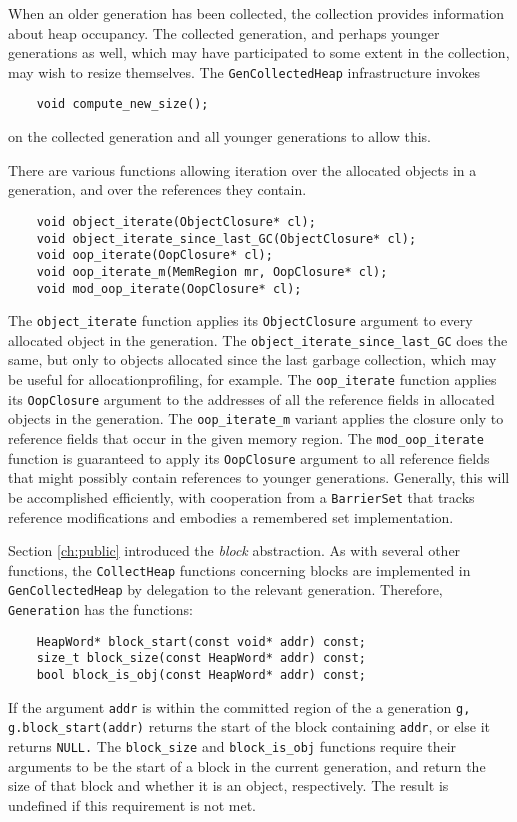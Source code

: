\documentclass{article}
\begin{document}
When an older generation has been collected, the collection provides
information about heap occupancy.  The collected generation, and
perhaps younger generations as well, which may have participated to
some extent in the collection, may wish to resize themselves.
The {\tt GenCollectedHeap} infrastructure invokes
\begin{verbatim}
    void compute_new_size();
\end{verbatim}
on the collected generation and all younger generations to allow this.

There are various functions allowing iteration over the allocated
objects in a generation, and over the references they contain.
\begin{verbatim}
    void object_iterate(ObjectClosure* cl);
    void object_iterate_since_last_GC(ObjectClosure* cl);
    void oop_iterate(OopClosure* cl);
    void oop_iterate_m(MemRegion mr, OopClosure* cl);
    void mod_oop_iterate(OopClosure* cl);
\end{verbatim}
The {\tt object\_iterate} function applies its {\tt ObjectClosure} argument
to every allocated object in the generation.  The 
{\tt object\_iterate\_since\_last\_GC} does the same, but only to objects
allocated since the last garbage collection, which may be useful for
allocationprofiling, for example.    The {\tt oop\_iterate} function applies its {\tt OopClosure}
argument to the addresses of all the reference fields in allocated
objects in the generation.  The {\tt oop\_iterate\_m} variant applies
the closure only to reference fields that occur in the given memory
region.  The {\tt mod\_oop\_iterate} function is guaranteed to apply its
{\tt OopClosure} argument to all reference fields that might possibly
contain references to younger generations.  Generally, this will be
accomplished efficiently, with cooperation from a {\tt BarrierSet}
that tracks reference modifications and embodies a remembered set
implementation.  

Section \ref{ch:public} introduced the {\em block} abstraction.  As
with several other functions, the {\tt CollectHeap} functions
concerning blocks are implemented in {\tt GenCollectedHeap} by
delegation to the relevant generation.  Therefore, {\tt Generation}
has the functions:
\begin{verbatim}
    HeapWord* block_start(const void* addr) const;
    size_t block_size(const HeapWord* addr) const;
    bool block_is_obj(const HeapWord* addr) const;
\end{verbatim}
If the argument {\tt addr} is within the committed region of the
a generation {\tt g,} {\tt g.block\_start(addr)} returns the start of
the block containing {\tt addr}, or else it returns {\tt NULL.}  The
{\tt block\_size} and {\tt block\_is\_obj} functions require their
arguments to be the start of a block in the current generation, and
return the size of that block and whether it is an object,
respectively.  The result is undefined if this requirement is not
met.
\end{document}
